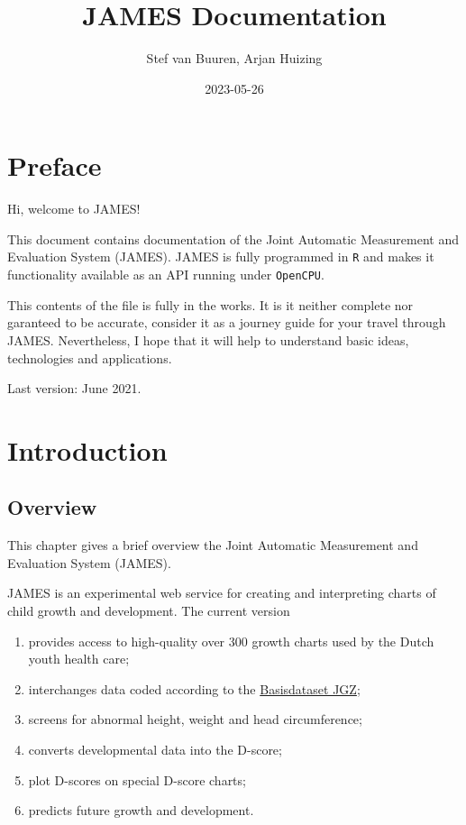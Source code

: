 \documentclass[
]{book}
\title{JAMES Documentation}
\author{Stef van Buuren, Arjan Huizing}
\date{2023-05-26}
\providecommand{\tightlist}{%
  \setlength{\itemsep}{0pt}\setlength{\parskip}{0pt}}
\begin{document}
\maketitle

{
\setcounter{tocdepth}{1}
\tableofcontents
}
\hypertarget{preface}{%
\chapter*{Preface}\label{preface}}

Hi, welcome to JAMES!

This document contains documentation of the Joint Automatic Measurement and Evaluation System (JAMES). JAMES is fully programmed in \texttt{R} and makes it functionality available as an API running under \texttt{OpenCPU}.

This contents of the file is fully in the works. It is it neither complete nor garanteed to be accurate, consider it as a journey guide for your travel through JAMES. Nevertheless, I hope that it will help to understand basic ideas, technologies and applications.

Last version: June 2021.

\hypertarget{intro}{%
\chapter{Introduction}\label{intro}}

\hypertarget{overview}{%
\section{Overview}\label{overview}}

This chapter gives a brief overview the Joint Automatic Measurement and Evaluation System (JAMES).

JAMES is an experimental web service for creating and interpreting charts of child growth and
development. The current version

\begin{enumerate}
\def\labelenumi{\arabic{enumi}.}
\tightlist
\item
  provides access to high-quality over 300 growth charts used by the Dutch youth health care;
\item
  interchanges data coded according to the \href{https://www.ncj.nl/themadossiers/informatisering/basisdataset/documentatie/?cat=13}{Basisdataset JGZ};
\item
  screens for abnormal height, weight and head circumference;
\item
  converts developmental data into the D-score;
\item
  plot D-scores on special D-score charts;
\item
  predicts future growth and development.
\end{enumerate}
\end{document}
